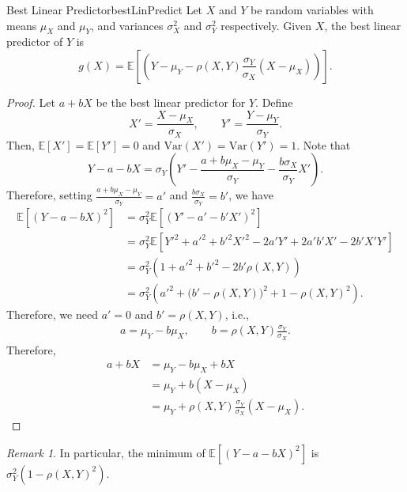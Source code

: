\documentclass[math]{amznotes}
\theoremstyle{remark}
\newtheorem*{remark}{Remark}
\newcommand{\0}{\mathbf{0}}
\newcommand{\1}{\mathbf{1}}
\begin{document}
\begin{thmbox}{Best Linear Predictor}{bestLinPredict}
    Let $X$ and $Y$ be random variables with means $\mu_X$ and $\mu_Y$, and variances $\sigma_X^2$ and $\sigma_Y^2$ respectively. Given $X$, the best linear predictor of $Y$ is
    \begin{equation*}
        g(X) = \mathbb{E}\left[\left(Y - \mu_Y - \rho(X, Y)\frac{\sigma_Y}{\sigma_X}(X - \mu_X)\right)\right].
    \end{equation*}
    \tcblower
    \begin{proof}
        Let $a + bX$ be the best linear predictor for $Y$. Define
        \begin{equation*}
            X' = \frac{X - \mu_X}{\sigma_X}, \qquad Y' = \frac{Y - \mu_Y}{\sigma_Y}.
        \end{equation*}
        Then, $\mathbb{E}\left[X'\right] = \mathbb{E}\left[Y'\right] = 0$ and $\mathrm{Var}(X') = \mathrm{Var}(Y') = 1$. Note that
        \begin{equation*}
            Y - a - bX = \sigma_Y\left(Y' - \frac{a + b\mu_X - \mu_Y}{\sigma_Y} - \frac{b\sigma_X}{\sigma_Y}X'\right).    
        \end{equation*}
        Therefore, setting $\frac{a + b\mu_X - \mu_Y}{\sigma_Y} = a'$ and $\frac{b\sigma_X}{\sigma_Y} = b'$, we have 
        \begin{align*}
            \mathbb{E}\left[(Y - a - bX)^2\right] & = \sigma_Y^2\mathbb{E}\left[\left(Y' - a' - b'X'\right)^2\right] \\
            & = \sigma_Y^2\mathbb{E}\left[Y'^2 + a'^2 + b'^2X'^2 - 2a'Y' + 2a'b'X' - 2b'X'Y'\right] \\
            & = \sigma_Y^2\left(1 + a'^2 + b'^2 - 2b'\rho(X, Y)\right) \\
            & = \sigma_Y^2\left(a'^2 + \bigl(b' - \rho(X, Y)\bigr)^2 + 1 - \rho(X, Y)^2\right).
        \end{align*}
        Therefore, we need $a' = 0$ and $b' = \rho(X, Y)$, i.e.,
        \begin{align*}
            a = \mu_Y - b\mu_X, \qquad b = \rho(X, Y)\frac{\sigma_Y}{\sigma_X}.
        \end{align*}
        Therefore, 
        \begin{align*}
            a + bX & = \mu_Y - b\mu_X + bX \\
            & = \mu_Y + b(X - \mu_X) \\
            & = \mu_Y + \rho(X, Y)\frac{\sigma_Y}{\sigma_X}(X - \mu_X).
        \end{align*}
    \end{proof}
\end{thmbox}
\begin{notebox}
    \begin{remark}
        In particular, the minimum of $\mathbb{E}\left[(Y - a - bX)^2\right]$ is $\sigma_Y^2\left(1 - \rho(X, Y)^2\right)$.
    \end{remark}
\end{notebox}
\end{document}

